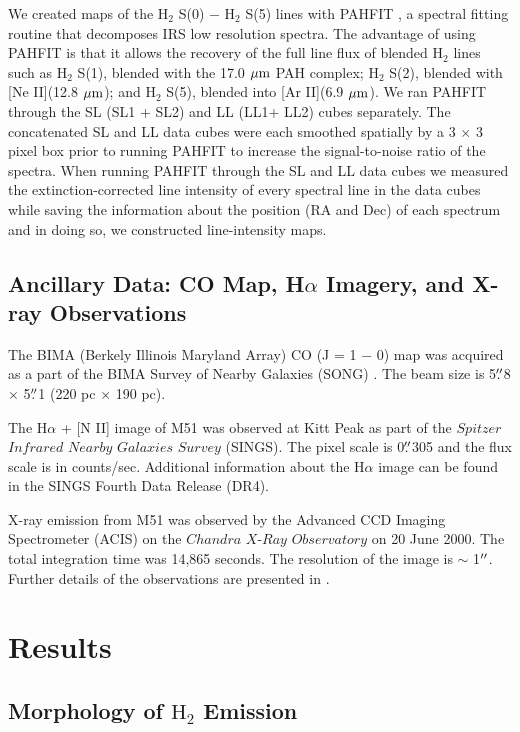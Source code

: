 \documentclass[manuscript]{aastex}
\begin{document}
We created maps of the $\mathrm{H_2}$ S(0) $-$ $\mathrm{H_2}$ S(5) lines with PAHFIT \citep{smi07}, a spectral fitting routine that decomposes IRS low resolution spectra.  The advantage of using PAHFIT is that it allows the recovery of the full line flux of blended $\mathrm{H_2}$ lines such as $\mathrm{H_2}$ S(1), blended with the 17.0 $\mbox{$\mu$m}$ PAH complex; $\mathrm{H_2}$ S(2), blended with [Ne II](12.8 $\mbox{$\mu$m}$); and $\mathrm{H_2}$ S(5), blended into [Ar II](6.9 $\mbox{$\mu$m}$).   We ran PAHFIT through the SL (SL1 + SL2) and LL (LL1+ LL2)  cubes separately.  The concatenated SL and LL data cubes were each smoothed spatially by a 3 $\times$ 3 pixel box prior to running PAHFIT to increase the signal-to-noise ratio of the spectra.  When running PAHFIT through the SL and LL data cubes we measured the extinction-corrected line intensity of every spectral line in the data cubes while saving the information about the position (RA and Dec) of each spectrum and in doing so, we constructed line-intensity maps.

\subsection{Ancillary Data: CO Map, H$\alpha$ Imagery, and X-ray Observations}

The BIMA (Berkely Illinois Maryland Array) CO (J = 1 $-$ 0) map was acquired as a part of the BIMA Survey of  Nearby Galaxies (SONG) \citep{reg01, hel03}.  The beam size is 5$\mbox{$.\!\!^{\prime\prime}$}$8 $\times$ 5$\mbox{$.\!\!^{\prime\prime}$}$1 (220 pc $\times$ 190 pc).

The H$\alpha$ + [N II] image of M51 was observed at Kitt Peak as part of the $Spitzer$ $Infrared$ $Nearby$ $Galaxies$ $Survey$ (SINGS).  The pixel scale is 0$\mbox{$.\!\!^{\prime\prime}$}$305 and the flux scale is in counts/sec.  Additional information about the H$\alpha$ image can be found in the SINGS Fourth Data Release (DR4). 

X-ray emission from M51 was observed by the Advanced CCD Imaging Spectrometer (ACIS) on the $Chandra$ $X$-$Ray$ $Observatory$ on 20 June 2000.  The total integration time was 14,865 seconds.  The resolution of the image is $\sim$ 1$\mbox{$^{\prime\prime}$}$.  Further details of the observations are presented in \citep{wil01}.

\section{Results}

\subsection{Morphology of $\mathrm{H_2}$ Emission}
\end{document}
